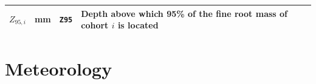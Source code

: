 \documentclass[]{book}
\begin{document}
\begin{longtable}[]{@{}llll@{}}
\begin{minipage}[t]{0.11\columnwidth}\raggedright\strut
\(Z_{95,i}\)\strut
\end{minipage} & \begin{minipage}[t]{0.10\columnwidth}\raggedright\strut
mm\strut
\end{minipage} & \begin{minipage}[t]{0.12\columnwidth}\raggedright\strut
\texttt{Z95}\strut
\end{minipage} & \begin{minipage}[t]{0.45\columnwidth}\raggedright\strut
Depth above which 95\% of the fine root mass of cohort \(i\) is
located\strut
\end{minipage}\tabularnewline
\bottomrule
\end{longtable}

\section{Meteorology}\label{meteorology}
\end{document}

